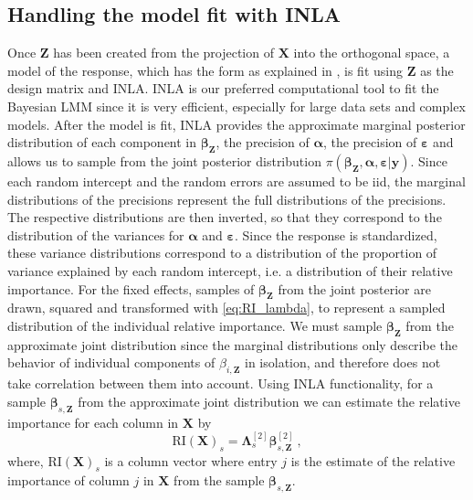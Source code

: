 \subsection{Handling the model fit with INLA}
\label{sec:BVI_handling}
Once $\mathbf{Z}$ has been created from the projection of $\mathbf{X}$ into the orthogonal space, a model of the response, which has the form as explained in , is fit using $\mathbf{Z}$ as the design matrix and INLA. 
INLA is our preferred computational tool to fit the Bayesian LMM since it is very efficient, especially for large data sets and complex models.
After the model is fit, INLA provides the approximate marginal posterior distribution of each component in $\boldsymbol{\beta}_{\mathbf{Z}}$, the precision of $\boldsymbol{\alpha}$, the precision of $\boldsymbol{\varepsilon}$ and allows us to sample from the joint posterior distribution $\pi(\boldsymbol{\beta}_{\mathbf{Z}}, \boldsymbol{\alpha}, \boldsymbol{\varepsilon} \lvert \mathbf{y})$. 
Since each random intercept and the random errors are assumed to be iid, the marginal distributions of the precisions represent the full distributions of the precisions. 
The respective distributions are then inverted, so that they correspond to the distribution of the variances for $\boldsymbol{\alpha}$ and $\boldsymbol{\varepsilon}$. 
Since the response is standardized, these variance distributions correspond to a distribution of the proportion of variance explained by each random intercept, i.e. a distribution of their relative importance.
For the fixed effects, samples of $\boldsymbol{\beta}_{\mathbf{Z}}$ from the joint posterior are drawn, squared and transformed with \eqref{eq:RI_lambda}, to represent a sampled distribution of the individual relative importance. 
We must sample $\boldsymbol{\beta}_{\mathbf{Z}}$ from the approximate joint distribution since the marginal distributions only describe the behavior of individual components of $\beta_{i, \mathbf{Z}}$ in isolation, and therefore does not take correlation between them into account.
Using INLA functionality, for a sample $\boldsymbol{\beta}_{s, \mathbf{Z}}$ from the approximate joint distribution we can estimate the relative importance for each column in $\mathbf{X}$ by
\begin{equation}
    \text{RI}(\mathbf{X})_s = \boldsymbol{\Lambda}_{s}^{[2]} \boldsymbol{\beta}_{s, \mathbf{Z}}^{[2]} \ ,
\end{equation}
where, $\text{RI}(\mathbf{X})_s$ is a column vector where entry $j$ is the estimate of the relative importance of column $j$ in $\mathbf{X}$ from the sample $\boldsymbol{\beta}_{s, \mathbf{Z}}$.
